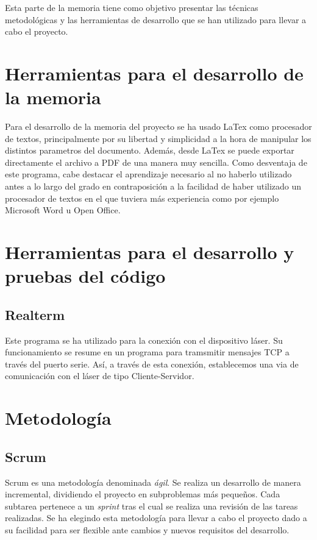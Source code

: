 
Esta parte de la memoria tiene como objetivo presentar las técnicas metodológicas y las herramientas de desarrollo que se han utilizado para llevar a cabo el proyecto. 


\section{Herramientas para el desarrollo de la memoria}
Para el desarrollo de la memoria del proyecto se ha usado LaTex como procesador de textos, principalmente por su libertad y simplicidad a la hora de manipular los distintos parametros del documento. Además, desde LaTex se puede exportar directamente el archivo a PDF de una manera muy sencilla.
Como desventaja de este programa, cabe destacar el aprendizaje necesario al no haberlo utilizado antes a lo largo del grado en contraposición a la facilidad de haber utilizado un procesador de textos en el que tuviera más experiencia como por ejemplo Microsoft Word u Open Office.

\section{Herramientas para el desarrollo y pruebas del código}

\subsection{Realterm}
Este programa se ha utilizado para la conexión con el dispositivo láser. Su funcionamiento se resume en un programa para tramsmitir mensajes TCP a través del puerto serie. Así, a través de esta conexión, establecemos una via de comunicación con el láser de tipo Cliente-Servidor.

\section{Metodología}
\subsection{Scrum}
Scrum es una metodología denominada \emph{ágil}.
Se realiza un desarrollo de manera incremental, dividiendo el proyecto en subproblemas más pequeños.
Cada subtarea pertenece a un \emph{sprint} tras el cual se realiza una revisión de las tareas realizadas.
Se ha elegindo esta metodología para llevar a cabo el proyecto dado a su facilidad para ser flexible ante cambios y nuevos requisitos del desarrollo.

